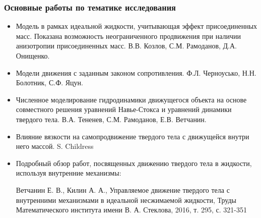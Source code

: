\begin{frame}
\frametitle{Основные работы по тематике исследования}
	
	\begin{itemize}
		\item Модель в рамках идеальной жидкости, учитывающая эффект присоединенных масс. Показана возможность неограниченного продвижения при наличии анизотропии присоединенных масс. В.В. Козлов, С.М. Рамоданов, Д.А. Онищенко.
	\end{itemize}

		\begin{minipage}[t]{0.6\linewidth}
			\vspace{-13mm}
			\begin{itemize}
				\item Модели движения с заданным законом сопротивления. Ф.Л. Черноусько, Н.Н. Болотник, С.Ф. Яцун.
			\end{itemize}
		\end{minipage}
		\hfill
		\begin{minipage}[t]{0.30\linewidth}
		\end{minipage}	
	
	\begin{itemize}
		\item Численное моделирование гидродинамики движущегося объекта на основе совместного решения уравнений Навье-Стокса и уравнений динамики твердого тела. В.А. Тененев, С.М. Рамоданов, Е.В. Ветчанин.
		
		\item Влияние вязкости на самопродвижение твердого тела с движущейся внутри него массой. S. Childress
		
		\item Подробный обзор работ, посвященных движению твердого тела в жидкости, используя внутренние механизмы:
		
		Ветчанин Е. В., Килин А. А., Управляемое движение твердого тела с внутренними механизмами в идеальной несжимаемой жидкости, Труды Математического института имени В. А. Стеклова, 2016, т. 295, с. 321-351
	\end{itemize}

\end{frame}

